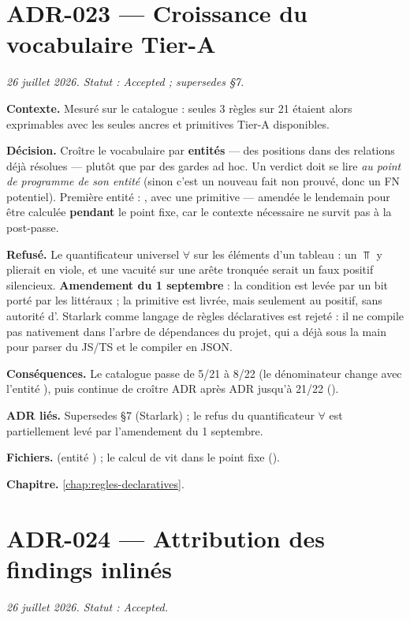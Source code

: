 \section{ADR-023 --- Croissance du vocabulaire Tier-A}
\label{adr:23}
\noindent\textit{26 juillet 2026. Statut : Accepted ; supersedes  §7.}

\textbf{Contexte.} Mesuré sur le catalogue : seules 3 règles sur 21 étaient
alors exprimables avec les seules ancres et primitives Tier-A disponibles.

\textbf{Décision.} Croître le vocabulaire par \textbf{entités} --- des
positions dans des relations déjà résolues --- plutôt que par des gardes ad
hoc. Un verdict doit se lire \emph{au point de programme de son entité}
(sinon c'est un nouveau fait non prouvé, donc un FN potentiel). Première
entité : , avec une primitive  --- amendée le
lendemain pour être calculée \textbf{pendant} le point fixe, car le contexte
nécessaire ne survit pas à la post-passe.

\textbf{Refusé.} Le quantificateur universel $\forall$ sur les éléments d'un
tableau : un $\Top$ y plierait en \og viole\fg{}, et une vacuité sur une arête
tronquée serait un faux positif silencieux. \textbf{Amendement du
1{\ier} septembre} : la condition est levée par un bit  porté par
les littéraux  ; la primitive  est livrée, mais
seulement au positif, sans autorité d'\Error{}. Starlark comme langage de
règles déclaratives est rejeté : il ne compile pas nativement dans l'arbre de
dépendances du projet, qui a déjà  sous la main pour parser du
JS/TS et le compiler en JSON.

\textbf{Conséquences.} Le catalogue passe de 5/21 à 8/22 (le dénominateur
change avec l'entité ), puis continue de croître ADR après ADR
jusqu'à 21/22 ().

\textbf{ADR liés.} Supersedes  §7 (Starlark) ; le refus du
quantificateur $\forall$ est partiellement levé par l'amendement du 1{\ier}
septembre.

\textbf{Fichiers.}  (entité ) ; le calcul de
 vit dans le point fixe
().

\textbf{Chapitre.} \cref{chap:regles-declaratives}.

\section{ADR-024 --- Attribution des findings inlinés}
\label{adr:24}
\noindent\textit{26 juillet 2026. Statut : Accepted.}

